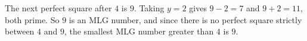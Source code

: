 The next perfect square after $4$ is $9$. Taking $y=2$ gives $9-2=7$ and $9+2=11$, both prime. So $9$ is an MLG number, and since there is no perfect square strictly between $4$ and $9$, the smallest MLG number greater than $4$ is $\boxed{9}$.
